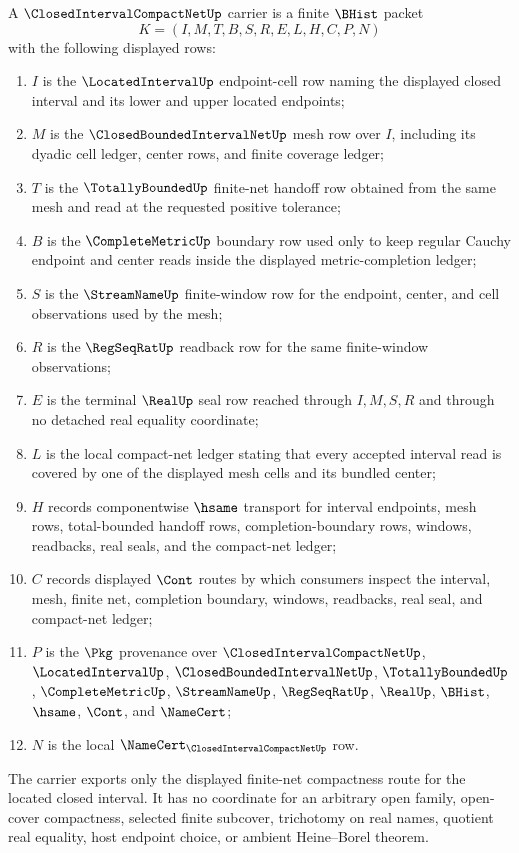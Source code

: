 \begin{definition}
\label{def:closed-interval-compact-net-carrier}
A $\ClosedIntervalCompactNetUp$ carrier is a finite $\BHist$ packet
$$
K=(I,M,T,B,S,R,E,L,H,C,P,N)
$$
with the following displayed rows:
\begin{enumerate}
\item $I$ is the $\LocatedIntervalUp$ endpoint-cell row naming the displayed closed interval and its lower and upper located endpoints;
\item $M$ is the $\ClosedBoundedIntervalNetUp$ mesh row over $I$, including its dyadic cell ledger, center rows, and finite coverage ledger;
\item $T$ is the $\TotallyBoundedUp$ finite-net handoff row obtained from the same mesh and read at the requested positive tolerance;
\item $B$ is the $\CompleteMetricUp$ boundary row used only to keep regular Cauchy endpoint and center reads inside the displayed metric-completion ledger;
\item $S$ is the $\StreamNameUp$ finite-window row for the endpoint, center, and cell observations used by the mesh;
\item $R$ is the $\RegSeqRatUp$ readback row for the same finite-window observations;
\item $E$ is the terminal $\RealUp$ seal row reached through $I,M,S,R$ and through no detached real equality coordinate;
\item $L$ is the local compact-net ledger stating that every accepted interval read is covered by one of the displayed mesh cells and its bundled center;
\item $H$ records componentwise $\hsame$ transport for interval endpoints, mesh rows, total-bounded handoff rows, completion-boundary rows, windows, readbacks, real seals, and the compact-net ledger;
\item $C$ records displayed $\Cont$ routes by which consumers inspect the interval, mesh, finite net, completion boundary, windows, readbacks, real seal, and compact-net ledger;
\item $P$ is the $\Pkg$ provenance over $\ClosedIntervalCompactNetUp$, $\LocatedIntervalUp$, $\ClosedBoundedIntervalNetUp$, $\TotallyBoundedUp$, $\CompleteMetricUp$, $\StreamNameUp$, $\RegSeqRatUp$, $\RealUp$, $\BHist$, $\hsame$, $\Cont$, and $\NameCert$;
\item $N$ is the local $\NameCert_{\ClosedIntervalCompactNetUp}$ row.
\end{enumerate}
The carrier exports only the displayed finite-net compactness route for the located closed interval. It has no coordinate for an arbitrary open family, open-cover compactness, selected finite subcover, trichotomy on real names, quotient real equality, host endpoint choice, or ambient Heine--Borel theorem.
\end{definition}

